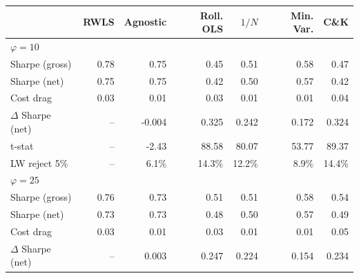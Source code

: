 \begin{tabular*}{\textwidth}{l@{\extracolsep{\fill}}rrrrrr}
\toprule
 & RWLS & Agnostic & Roll. OLS & $1/N$ & Min. Var. & C\&K \\
\midrule
\multicolumn{7}{l}{\textit{$\varphi = 10$}} \\
\midrule
Sharpe (gross) & 0.78\phantom{$^{***}$} & 0.75\phantom{$^{***}$} & 0.45\phantom{$^{***}$} & 0.51\phantom{$^{***}$} & 0.58\phantom{$^{***}$} & 0.47\phantom{$^{***}$} \\
Sharpe (net) & 0.75\phantom{$^{***}$} & 0.75\phantom{$^{***}$} & 0.42\phantom{$^{***}$} & 0.50\phantom{$^{***}$} & 0.57\phantom{$^{***}$} & 0.42\phantom{$^{***}$} \\
Cost drag & 0.03\phantom{$^{***}$} & 0.01\phantom{$^{***}$} & 0.03\phantom{$^{***}$} & 0.01\phantom{$^{***}$} & 0.01\phantom{$^{***}$} & 0.04\phantom{$^{***}$} \\
$\Delta$ Sharpe (net) & --\phantom{$^{***}$} & -0.004\rlap{$^{**}$}\phantom{$^{***}$} & 0.325\rlap{$^{***}$}\phantom{$^{***}$} & 0.242\rlap{$^{***}$}\phantom{$^{***}$} & 0.172\rlap{$^{***}$}\phantom{$^{***}$} & 0.324\rlap{$^{***}$}\phantom{$^{***}$} \\
t-stat & --\phantom{$^{***}$} & -2.43\phantom{$^{***}$} & 88.58\phantom{$^{***}$} & 80.07\phantom{$^{***}$} & 53.77\phantom{$^{***}$} & 89.37\phantom{$^{***}$} \\
LW reject 5\% & --\phantom{$^{***}$} & 6.1\%\phantom{$^{***}$} & 14.3\%\phantom{$^{***}$} & 12.2\%\phantom{$^{***}$} & 8.9\%\phantom{$^{***}$} & 14.4\%\phantom{$^{***}$} \\
\midrule
\multicolumn{7}{l}{\textit{$\varphi = 25$}} \\
\midrule
Sharpe (gross) & 0.76\phantom{$^{***}$} & 0.73\phantom{$^{***}$} & 0.51\phantom{$^{***}$} & 0.51\phantom{$^{***}$} & 0.58\phantom{$^{***}$} & 0.54\phantom{$^{***}$} \\
Sharpe (net) & 0.73\phantom{$^{***}$} & 0.73\phantom{$^{***}$} & 0.48\phantom{$^{***}$} & 0.50\phantom{$^{***}$} & 0.57\phantom{$^{***}$} & 0.49\phantom{$^{***}$} \\
Cost drag & 0.03\phantom{$^{***}$} & 0.01\phantom{$^{***}$} & 0.03\phantom{$^{***}$} & 0.01\phantom{$^{***}$} & 0.01\phantom{$^{***}$} & 0.05\phantom{$^{***}$} \\
$\Delta$ Sharpe (net) & --\phantom{$^{***}$} & 0.003\rlap{$^{**}$}\phantom{$^{***}$} & 0.247\rlap{$^{***}$}\phantom{$^{***}$} & 0.224\rlap{$^{***}$}\phantom{$^{***}$} & 0.154\rlap{$^{***}$}\phantom{$^{***}$} & 0.234\rlap{$^{***}$}\phantom{$^{***}$} \\

\end{tabular*}
